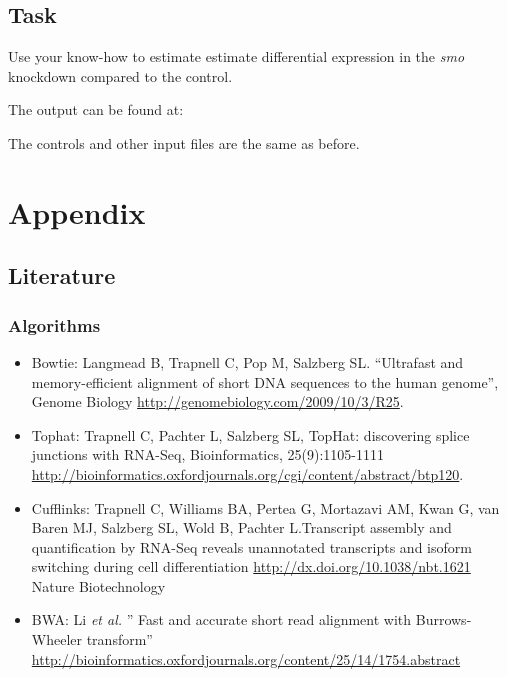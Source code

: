 \documentclass[a4paper,11pt,english]{sphinxmanual}
\begin{document}
\section{Task}
\label{exercises/STEP4_CUFFLINKS_DE:id1}
Use your know-how to estimate estimate differential expression in the \emph{smo} knockdown compared to the control.

The output can be found at: 

The controls and other input files are the same as before.


\chapter{Appendix}
\label{ReadingList:appendix}\label{ReadingList::doc}

\section{Literature}
\label{ReadingList:literature}

\subsection{Algorithms}
\label{ReadingList:algorithms}\begin{itemize}
\item {} 
Bowtie:
Langmead B, Trapnell C, Pop M, Salzberg SL. “Ultrafast and memory-efficient alignment of short DNA sequences to the human genome”, Genome Biology \href{http://genomebiology.com/2009/10/3/R25}{http://genomebiology.com/2009/10/3/R25}.

\item {} 
Tophat:
Trapnell C, Pachter L, Salzberg SL, TopHat: discovering splice junctions with RNA-Seq, Bioinformatics, 25(9):1105-1111 \href{http://bioinformatics.oxfordjournals.org/cgi/content/abstract/btp120}{http://bioinformatics.oxfordjournals.org/cgi/content/abstract/btp120}.

\item {} 
Cufflinks:
Trapnell C, Williams BA, Pertea G, Mortazavi AM, Kwan G, van Baren MJ, Salzberg SL, Wold B, Pachter L.Transcript assembly and quantification by RNA-Seq reveals unannotated transcripts and isoform switching during cell differentiation \href{http://dx.doi.org/10.1038/nbt.1621}{http://dx.doi.org/10.1038/nbt.1621} Nature Biotechnology

\item {} 
BWA:
Li \emph{et al.} '' Fast and accurate short read alignment with Burrows-Wheeler transform'' \href{http://bioinformatics.oxfordjournals.org/content/25/14/1754.abstract}{http://bioinformatics.oxfordjournals.org/content/25/14/1754.abstract}

\end{itemize}
\end{document}
